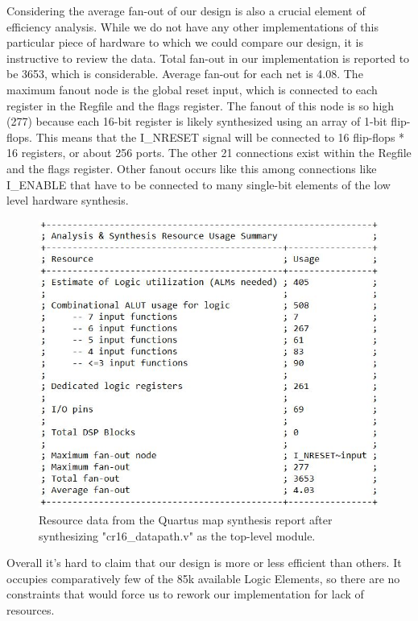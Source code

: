 \documentclass[conference]{IEEEtran}
\begin{document}
Considering the average fan-out of our design is also a crucial element of efficiency analysis. While we do not have any other implementations of this particular piece of hardware to which we could compare our design, it is instructive to review the data. Total fan-out in our implementation is reported to be 3653, which is considerable. Average fan-out for each net is 4.08. The maximum fanout node is the global reset input, which is connected to each register in the Regfile and the flags register. The fanout of this node is so high (277) because each 16-bit register is likely synthesized using an array of 1-bit flip-flops. This means that the I\_NRESET signal will be connected to 16 flip-flops * 16 registers, or about 256 ports. The other 21 connections exist within the Regfile and the flags register. Other fanout occurs like this among connections like I\_ENABLE that have to be connected to many single-bit elements of the low level hardware synthesis.
\begin{figure}[h]
    \centering
    \includegraphics[scale=0.5]{lab_2_figures/analysis_and_synthesis_resources.JPG}
    \caption{Resource data from the Quartus map synthesis report after synthesizing "cr16\_datapath.v" as the top-level module.}
    \label{fig:datapath_analysis_resources}
\end{figure}
Overall it's hard to claim that our design is more or less efficient than others. It occupies comparatively few of the 85k available Logic Elements, so there are no constraints that would force us to rework our implementation for lack of resources.
\end{document}
